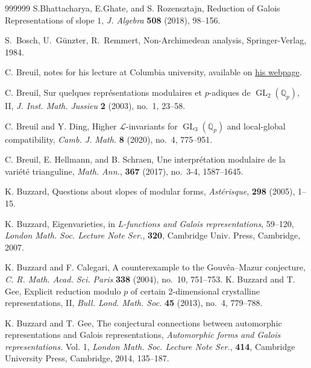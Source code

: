 \documentclass[12pt]{amsart}
\theoremstyle{definition}
\numberwithin{equation}{subsection}
\def\calL{\mathcal{L}}
\def\QQ{\mathbb{Q}}
\DeclareMathOperator{\GL}{GL}
\begin{document}
\begin{thebibliography}{999999}
S.Bhattacharya,  E.Ghate, and S. Rozensztajn, Reduction of Galois Representations of slope $1$, {\it J. Algebra} {\bf 508} (2018), 98--156.

S.~Bosch, U.~G\"unzter, R.~Remmert, Non-Archimedean analysis, Springer-Verlag, 1984.

C. Breuil, notes for his lecture at Columbia university,  available
on \href{https://www.imo.universite-paris-saclay.fr/~christophe.breuil/PUBLICATIONS/New-York.pdf}{his webpage}.

C. Breuil, Sur quelques repr\'esentations modulaires et $p$-adiques de $\GL_2(\QQ_p)$, II, {\it
	J. Inst. Math. Jussieu} {\bf 2} (2003), no.~1,  23--58.

C. Breuil and Y. Ding,
Higher $\calL$-invariants for $\GL_3(\QQ_p)$ and local-global compatibility, {\it Camb. J. Math.} {\bf 8} (2020), no.~4, 775--951.

C. Breuil, E. Hellmann, and B. Schraen, Une interpr\'etation modulaire de la vari\'et\'e trianguline, {\it Math. Ann.}, {\bf 367} (2017), no.~3-4, 1587--1645.


K. Buzzard,
Questions about slopes of modular forms, {\it Ast\'erisque}, {\bf 298} (2005), 1--15.


K. Buzzard,
Eigenvarieties, in {\it L-functions and Galois representations}, 59--120,
{\it London Math. Soc. Lecture Note Ser.}, {\bf 320}, Cambridge Univ. Press, Cambridge, 2007.


K. Buzzard and F. Calegari,
A counterexample to the Gouv\^ea--Mazur conjecture, {\it C. R. Math. Acad. Sci. Paris} {\bf 338} (2004), no.~10, 751--753.
K. Buzzard and T. Gee,
Explicit reduction modulo $p$ of certain $2$-dimensional crystalline representations, II, {\it Bull. Lond. Math. Soc.} {\bf 45} (2013), no.~4,  779--788.

K. Buzzard and T. Gee,
The conjectural connections between automorphic representations and Galois representations, {\it Automorphic forms and Galois representations.} Vol. 1, 
{\it London Math. Soc. Lecture Note Ser.}, {\bf 414},
Cambridge University Press, Cambridge, 2014, 135--187. 



\end{thebibliography}
\end{document}

